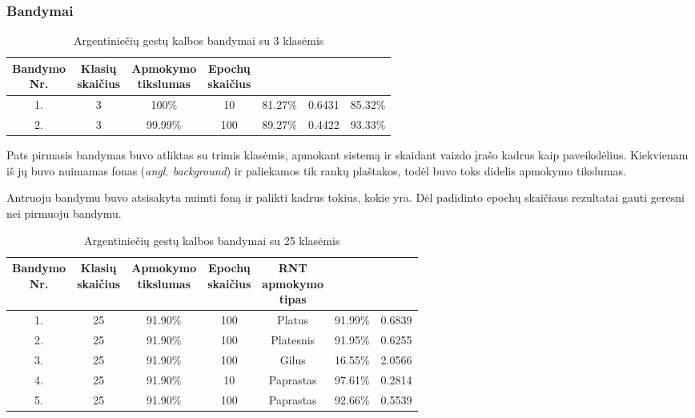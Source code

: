 \documentclass{VUMIFPSbakalaurinis}
\begin{document}
\subsubsection{Bandymai}
\begin{table}[H]\footnotesize
	\centering
	\caption{Argentiniečių gestų kalbos bandymai su 3 klasėmis}
	{\begin{tabular}{| c | c | c | c | c | c | c |} \hline
		\thead{Bandymo\\Nr.} & \thead{Klasių\\skaičius} & \thead{Apmokymo\\tikslumas} & \thead{Epochų\\skaičius} & \thead{Tikslumas} & \thead{Praradimas} & \thead{Testavimas}  \\
		\hline
		1. & 3 & 100\% & 10 & 81.27\% & 0.6431 & 85.32\% \\
		\hline
		2. & 3 & 99.99\% & 100 & 89.27\% & 0.4422 & 93.33\% \\
		\hline
	\end{tabular}}
	\label{tab:asl-bandymai1}
\end{table}

Pats pirmasis bandymas buvo atliktas su trimis klasėmis, apmokant sistemą ir skaidant vaizdo įrašo kadrus kaip paveikslėlius. Kiekvienam iš jų buvo nuimamas fonas (\textit{angl. background}) ir paliekamos tik rankų plaštakos, todėl buvo toks didelis apmokymo tikslumas.

Antruoju bandymu buvo atsisakyta nuimti foną ir palikti kadrus tokius, kokie yra. Dėl padidinto epochų skaičiaus rezultatai gauti geresni nei pirmuoju bandymu.

\begin{table}[H]\footnotesize
	\centering
	\caption{Argentiniečių gestų kalbos bandymai su 25 klasėmis}
	{\begin{tabular}{| c | c | c | c | c | c | c |} \hline
		\thead{Bandymo\\Nr.} & \thead{Klasių\\skaičius} & \thead{Apmokymo\\tikslumas} & \thead{Epochų\\skaičius} & \thead{RNT\\apmokymo\\tipas} & \thead{Tikslumas} & \thead{Praradimas}  \\
		\hline
		1. & 25 & 91.90\% & 100 & Platus & 91.99\% & 0.6839 \\
		\hline
		2. & 25 & 91.90\% & 100 & Platesnis & 91.95\% & 0.6255 \\
		\hline
		3. & 25 & 91.90\% & 100 & Gilus & 16.55\% & 2.0566 \\
		\hline
		4. & 25 & 91.90\% & 10 & Paprastas & 97.61\% & 0.2814 \\
		\hline
		5. & 25 & 91.90\% & 100 & Paprastas & 92.66\% & 0.5539 \\
		\hline
	\end{tabular}}
	\label{tab:asl-bandymai2}
\end{table}
\end{document}
